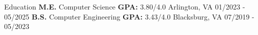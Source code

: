 \documentclass{resume}
\begin{document}
    \maketitle

    \begin{resSection}{Education} \vspace{1ex}
        {\textbf{M.E.} Computer Science}
        {\textbf{GPA:} 3.80/4.0}
        {Arlington, VA}
        {01/2023 - 05/2025}
        {\textbf{B.S.} \space Computer Engineering}
        {\textbf{GPA:} 3.43/4.0}
        {Blacksburg, VA}
        {07/2019 - 05/2023}

    \end{resSection}

\end{document}
